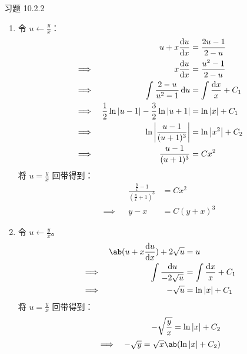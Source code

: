 \begin{problem}
    习题 10.2.2
    \begin{solution}
        \begin{enumerate}
            \item[\textbf{2)}] 令 $u \gets \frac{y}{x}$：
            $$
            \begin{aligned}
                & & u + x \dv{u}{x} & = \frac{2u - 1}{2 - u} \\
                \implies & & x \dv{u}{x} & = \frac{u^2 - 1}{2 - u} \\
                \implies & & \int \frac{2 - u}{u^2 - 1} \dd{u} & = \int \frac{\dd{x}}{x} + C_1 \\
                \implies & & \frac{1}{2} \ln |u - 1| - \frac{3}{2} \ln |u + 1| & = \ln |x| + C_1 \\
                \implies & & \ln \abs{\frac{u - 1}{(u + 1)^3}} & = \ln \abs{x^2} + C_2 \\
                \implies & & \frac{u - 1}{(u + 1)^3} & = C x^2 \\
            \end{aligned}
            $$
            将 $u = \frac{y}{x}$ 回带得到：
            $$
            \begin{aligned}
                & & \frac{\frac{y}{x} - 1}{(\frac{y}{x} + 1)^3} & = C x^2 \\
                \implies & & y - x & = C (y + x)^3
            \end{aligned}
            $$

            \item[\textbf{4)}] 令 $u \gets \frac{y}{x}$。
            $$
            \begin{aligned}
                & & \ab(u + x \dv{u}{x}) +  2 \sqrt{u} & = u \\
                \implies & & \int \frac{\dd{u}}{-2 \sqrt{u}} & = \int \frac{\dd{x}}{x} + C_1 \\
                \implies & & - \sqrt{u} & = \ln |x| + C_1
            \end{aligned}
            $$
            将 $u = \frac{y}{x}$ 回带得到：
            $$
            \begin{aligned}
                & & - \sqrt{\frac{y}{x}} = \ln |x| + C_2 \\
                \implies & & - \sqrt{y} = \sqrt{x} \ab(\ln |x| + C_2)
            \end{aligned}
            $$
        \end{enumerate}
    \end{solution}
\end{problem}

